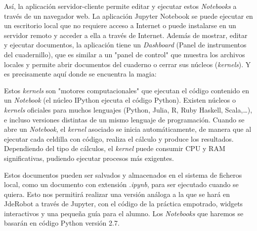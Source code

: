 Así, la aplicación servidor-cliente permite editar y ejecutar estos \textit{Notebooks} a través de un navegador web. La aplicación Jupyter Notebook se puede ejecutar en un escritorio local que no requiere acceso a Internet o puede instalarse en un servidor remoto y acceder a ella a través de Internet. Además de mostrar, editar y ejecutar documentos, la aplicación tiene un \textit{Dashboard} (Panel de instrumentos del cuadernillo), que es similar a un "panel de control" que muestra los archivos locales y permite abrir documentos del cuaderno o cerrar sus núcleos (\textit{kernels}). Y es precisamente aquí donde se encuentra la magia: 

Estos \textit{kernels} son "motores computacionales" que ejecutan el código contenido en un \textit{Notebook} (el núcleo IPython ejecuta el código Python). Existen núcleos o \textit{kernels} oficiales para muchos lenguajes (Python, Julia, R, Ruby Haskell, Scala,…), e incluso versiones distintas de un mismo lenguaje de programación. Cuando se abre un \textit{Notebook}, el \textit{kernel} asociado se inicia automáticamente, de manera que al ejecutar cada celdilla con código, realiza el cálculo y produce los resultados.  Dependiendo del tipo de cálculos, el \textit{kernel} puede consumir CPU y RAM significativas, pudiendo ejecutar procesos más exigentes. 

Estos documentos pueden ser salvados y almacenados en el sistema de ficheros local, como un documento con extensión \textit{.ipynb}, para ser ejecutado cuando se quiera. Esto nos permitirá realizar una versión análoga a la que se hará en JdeRobot a través de Jupyter, con el código de la práctica empotrado, widgets interactivos y una pequeña guía para el alumno. Los \textit{Notebooks} que haremos se basarán en código Python versión 2.7. 